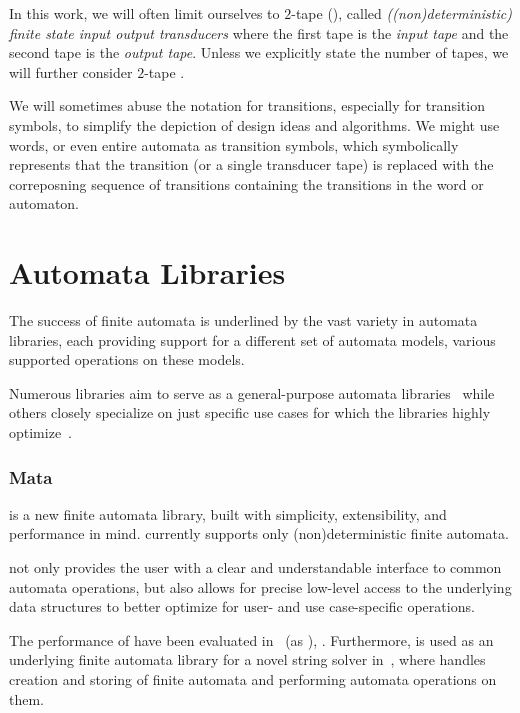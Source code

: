 
In this work, we will often limit ourselves to $2$-tape \nfts (\dfts), called \emph{((non)deterministic) finite state input output transducers} where the first tape is the \emph{input tape} and the second tape is the \emph{output tape}.
Unless we explicitly state the number of tapes, we will further consider $2$-tape \nfts.

We will sometimes abuse the notation for transitions, especially for transition symbols, to simplify the depiction of design ideas and algorithms.
We might use words, or even entire automata as transition symbols, which symbolically represents that the transition (or a single transducer tape) is replaced with the correposning sequence of transitions containing the transitions in the word or automaton.

\chapter{Automata Libraries}
\label{chap:finite_automata}

The success of finite automata is underlined by the vast variety in automata libraries, each providing support for a different set of automata models, various supported operations on these models.

Numerous libraries aim to serve as a general-purpose automata libraries~\cite{automatanet, tacas24_mata_10.1007/978-3-031-57249-4_7,fado} while others closely specialize on just specific use cases for which the libraries highly optimize~\cite{mona,automatajar}.

\subsection{Mata}

\mata is a new finite automata library, built with simplicity, extensibility, and performance in mind.
\mata currently supports only (non)deterministic finite automata.

\mata not only provides the user with a clear and understandable interface to common automata operations, but also allows for precise low-level access to the underlying data structures to better optimize for user- and use case-specific operations.

The performance of \mata have been evaluated in~\cite{cade23_reasoning_regular_properties_comparision_DBLP:conf/cade/FiedorHHRSV23} (as \enfa), \cite{tacas24_mata_10.1007/978-3-031-57249-4_7}.
Furthermore, \mata is used as an underlying finite automata library for a novel string solver \noodler in~\cite{fm23fm23_equations_synergy_regular_constraints_DBLP:conf/fm/BlahoudekCCHHLS23, oopsla23_stabilization_DBLP:journals/pacmpl/ChenCHHLS23,tacas24_noodler_10.1007/978-3-031-57246-3_2}, where \mata handles creation and storing of finite automata and performing automata operations on them.

